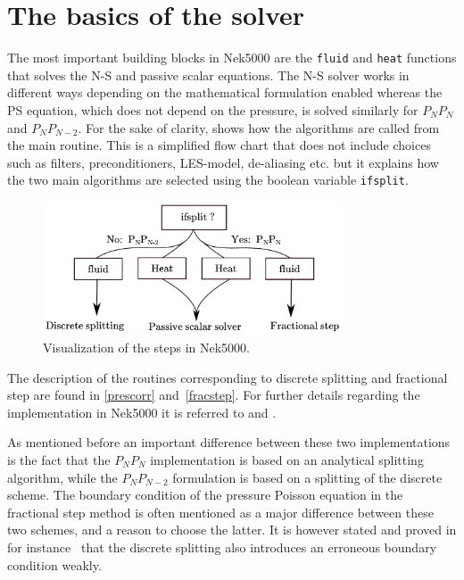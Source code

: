 \section{The basics of the solver}
The most important building blocks in Nek5000 are the \verb|fluid| and \verb|heat| functions that solves the 
N-S and passive scalar equations. The N-S solver works in different ways depending on the mathematical formulation
enabled whereas the PS equation, which does not depend on the pressure, is solved similarly for $P_NP_N$ and $P_NP_{N-2}$. 
For the sake of clarity,  shows how the algorithms are called from the main routine.
This is a simplified flow chart that does not include choices such as filters, preconditioners, LES-model, 
de-aliasing etc. but it explains how the two main algorithms are selected using the boolean variable \verb|ifsplit|. 
%
\begin{figure}[h]
	\centering
	\includegraphics[width=0.8\textwidth]{Figures/Nek.pdf}
	\caption{Visualization of the steps in Nek5000.}
	\label{fig:files}
\end{figure}
%

The description of the routines corresponding to discrete splitting and fractional step are found in 
\cref{prescorr} and~\ref{fracstep}. For further details regarding the 
implementation in Nek5000 it is referred to \cite{Fischer_hybridschwarz-multigrid}
and \cite{TomboulidesPnPn}.

As mentioned before an important difference between these two implementations is the fact that the $P_NP_N$ 
implementation is based on an analytical splitting algorithm, while the $P_NP_{N-2}$ formulation is based on 
a splitting of the discrete scheme. The boundary condition of the pressure Poisson equation in the fractional step method
is often mentioned as a major difference between these two schemes, and a reason to choose the latter.
It is however stated and proved in for instance~\cite{Guermond2006} that the discrete splitting also
introduces an erroneous boundary condition weakly.


